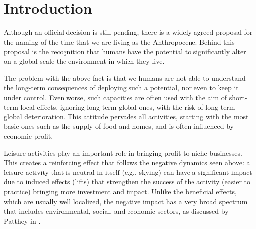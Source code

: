 \documentclass[sustainability,article,submit,pdftex,moreauthors]{Definitions/mdpi}
\begin{document}






\section{Introduction}

Although an official decision is still pending, there is a widely agreed proposal for the naming of the time that we are living as the Anthropocene.  Behind this proposal is the recognition that humans have the potential to significantly alter on a global scale the environment in which they live.

The problem with the above fact is that we humans are not able to understand the long-term consequences of deploying such a potential, nor even to keep it under control. Even worse, such capacities are often used with the aim of short-term local effects, ignoring long-term global ones, with the risk of long-term global deterioration. This attitude pervades all activities, starting with the most basic ones such as the supply of food and homes, and is often influenced by economic profit.

Leisure activities play an important role in bringing profit to niche businesses. This creates a reinforcing effect that follows the negative dynamics seen above: a leisure activity that is neutral in itself (e.g., skying) can have a significant impact due to induced effects (lifts) that strengthen the success of the activity (easier to practice) bringing more investment and impact. Unlike the beneficial effects, which are usually well localized, the negative impact has a very broad spectrum that includes environmental, social, and economic sectors, as discussed by Patthey in \cite{pat08a}.
\end{document}
